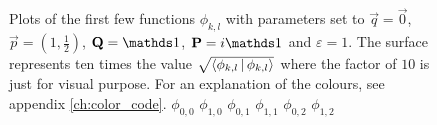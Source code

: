 \begin{figure}
{  } \\
   \\
  \caption[Plots of some basis functions $\phi$]{
    Plots of the first few functions $\phi_{k,l}$ with parameters set
    to $\vec{q} = \vec{0}$, $\vec{p} = (1, \frac{1}{2})$, $\mat{Q} = \id$, $\mat{P} = i \id$
    and $\varepsilon = 1$. The surface represents ten times the value
    $\sqrt{\Braket{\phi_{k,l}|\phi_{k,l}}}$ where the factor of $10$
    is just for visual purpose. For an explanation of the colours, see appendix \ref{ch:color_code}.
     $\phi_{0,0}$
     $\phi_{1,0}$
     $\phi_{0,1}$
     $\phi_{1,1}$
     $\phi_{0,2}$
     $\phi_{1,2}$
    \label{fig:phi_table_1}
  }
\end{figure}


